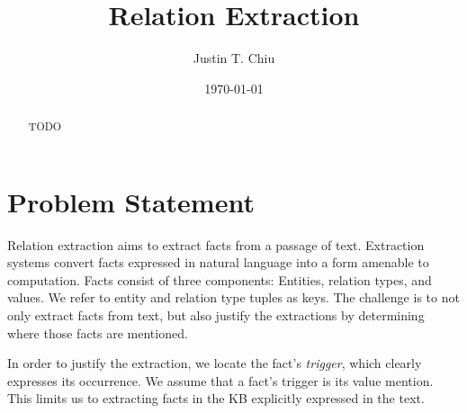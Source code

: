 \documentclass[12pt]{article}
\title{Relation Extraction}
\author{
Justin T. Chiu
}
\date{\today}
\begin{document}
\maketitle

\begin{abstract}
TODO
\end{abstract}

\section{Problem Statement}
\begin{comment}
NOTE on RE vs KBP: KBP focuses on modeling the full database, whereas
in RE the emphasis is on explaining extractions.
KBP usually has a more complicated model over the KB,
while RE sometimes makes simplifying assumptions and could make a poor
KBP system.
Example: if triple double appears in text and someone scored < 10 PTS,
then it's more likely they more likely had > 10 REB.
The difference between RE and KBP is subtle. Both fall under
information extraction, and the models may overlap in many ways.
In fact, latent variable model approaches to RE are usually able to perform KBP as well.
However, the focus is usually not on having good aggregate extraction metrics,
but rather about identifying where facts are in text.
This leads to simplifying assumptions in the model of the KB itself.
On the other hand, KBP moves the difficulty from explaining extractions to
faithfully modeling the KB.
Typically this results in a challenging inference task, as the structure
of the KB may be very complex.
\end{comment}

Relation extraction aims to extract facts from a passage of text.
Extraction systems convert facts expressed in natural language into a form
amenable to computation.
Facts consist of three components: Entities, relation types, and values.
We refer to entity and relation type tuples as keys.
The challenge is to not only extract facts from text, but also
justify the extractions by determining where those facts are mentioned.

In order to justify the extraction, we locate the fact's \textit{trigger},
which clearly expresses its occurrence.
We assume that a fact's trigger is its value mention.
This limits us to extracting facts in the KB explicitly expressed in the text.

\begin{comment}
(Move or delete later)
A \textit{mention} is a surface realization of an abstract object in text.
In relation extraction we justify extractions by identifying fact mentions.
As text is noisy, the realization of a fact may be difficult to locate.
We focus on locating fact mentions at the word level by identifying
individual words as value mentions, rather than entity or type mentions.
We define a `word-level' decision, value, or process as pertaining to individual words,
while `sequence-level' refers to a single decision, value, or process for a whole sequence.
\end{comment}
\end{document}
